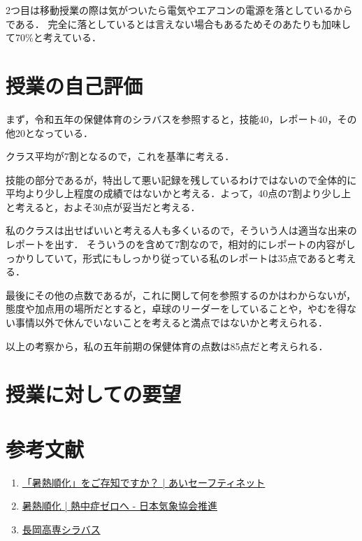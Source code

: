 \documentclass[twocolumn]{jsarticle}
\begin{document}
  2つ目は移動授業の際は気がついたら電気やエアコンの電源を落としているからである．
  完全に落としているとは言えない場合もあるためそのあたりも加味して70\%と考えている．


\section{授業の自己評価}
まず，令和五年の保健体育のシラバスを参照すると，技能40，レポート40，その他20となっている．

クラス平均が7割となるので，これを基準に考える．

技能の部分であるが，特出して悪い記録を残しているわけではないので全体的に平均より少し上程度の成績ではないかと考える．よって，40点の7割より少し上と考えると，およそ30点が妥当だと考える．

私のクラスは出せばいいと考える人も多くいるので，そういう人は適当な出来のレポートを出す．
そういうのを含めて7割なので，相対的にレポートの内容がしっかりしていて，形式にもしっかり従っている私のレポートは35点であると考える．

最後にその他の点数であるが，これに関して何を参照するのかはわからないが，態度や加点用の場所だとすると，卓球のリーダーをしていることや，やむを得ない事情以外で休んでいないことを考えると満点ではないかと考えられる．

以上の考察から，私の五年前期の保健体育の点数は85点だと考えられる．

\section{授業に対しての要望}

\section*{参考文献}
\begin{enumerate}
  \item \href{https://kawakita.or.jp/aisafetynet/aistation/news/「温熱順化」をご存知ですか？/}{「暑熱順化」をご存知ですか？ | あいセーフティネット}
  \item \href{https://www.netsuzero.jp/learning/le15}{暑熱順化 | 熱中症ゼロへ - 日本気象協会推進}
  \item \href{https://syllabus.kosen-k.go.jp/Pages/PublicSyllabus?school_id=16&department_id=14&subject_id=0102&year=2018&lang=ja}{長岡高専シラバス}
\end{enumerate}
\end{document}

